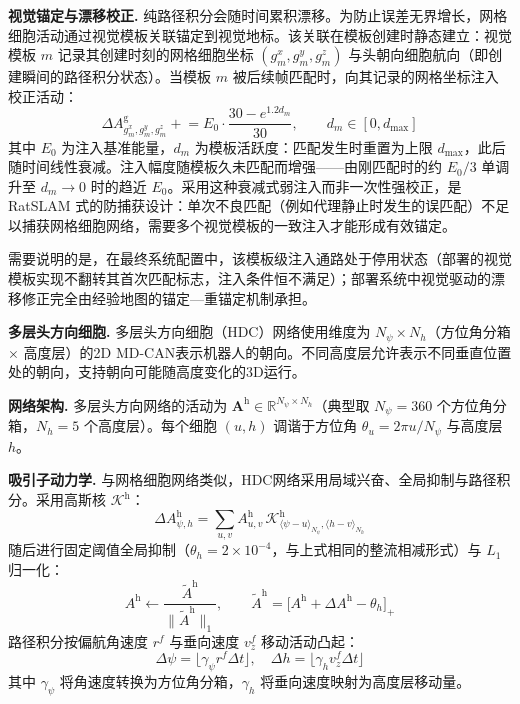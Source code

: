 \textbf{视觉锚定与漂移校正.} 纯路径积分会随时间累积漂移。为防止误差无界增长，网格细胞活动通过视觉模板关联锚定到视觉地标。该关联在模板创建时静态建立：视觉模板 $m$ 记录其创建时刻的网格细胞坐标 $(g^x_m,g^y_m,g^z_m)$ 与头朝向细胞航向（即创建瞬间的路径积分状态）。当模板 $m$ 被后续帧匹配时，向其记录的网格坐标注入校正活动：
\begin{equation}
    \Delta A^\mathrm{g}_{g^x_m,g^y_m,g^z_m} \mathrel{+}= E_0\cdot\frac{30-e^{1.2 d_m}}{30},\qquad d_m\in[0,d_{\max}]
\end{equation}
其中 $E_0$ 为注入基准能量，$d_m$ 为模板活跃度：匹配发生时重置为上限 $d_{\max}$，此后随时间线性衰减。注入幅度随模板久未匹配而增强——由刚匹配时的约 $E_0/3$ 单调升至 $d_m\to 0$ 时的趋近 $E_0$。采用这种衰减式弱注入而非一次性强校正，是 RatSLAM 式的防捕获设计：单次不良匹配（例如代理静止时发生的误匹配）不足以捕获网格细胞网络，需要多个视觉模板的一致注入才能形成有效锚定。

需要说明的是，在最终系统配置中，该模板级注入通路处于停用状态（部署的视觉模板实现不翻转其首次匹配标志，注入条件恒不满足）；部署系统中视觉驱动的漂移修正完全由经验地图的锚定—重锚定机制承担。

\textbf{多层头方向细胞.} 多层头方向细胞（HDC）网络使用维度为 $N_\psi \times N_h$（方位角分箱 $\times$ 高度层）的2D MD-CAN表示机器人的朝向。不同高度层允许表示不同垂直位置处的朝向，支持朝向可能随高度变化的3D运行。

\textbf{网络架构.} 多层头方向网络的活动为 $\mathbf{A}^\mathrm{h} \in \mathbb{R}^{N_\psi \times N_h}$（典型取 $N_\psi = 360$ 个方位角分箱，$N_h = 5$ 个高度层）。每个细胞 $(u, h)$ 调谐于方位角 $\theta_u = 2\pi u / N_\psi$ 与高度层 $h$。

\textbf{吸引子动力学.} 与网格细胞网络类似，HDC网络采用局域兴奋、全局抑制与路径积分。采用高斯核 $\mathcal{K}^\mathrm{h}$：
\begin{equation}
    \Delta A^\mathrm{h}_{\psi,h}=\sum_{u,v}A^\mathrm{h}_{u,v}\,\mathcal{K}^\mathrm{h}_{\langle \psi-u\rangle_{N_\psi},\langle h-v\rangle_{N_h}}
\end{equation}
随后进行固定阈值全局抑制（$\theta_h = 2\times10^{-4}$，与上式相同的整流相减形式）与 $L_1$ 归一化：
\begin{equation}
    A^\mathrm{h}\leftarrow \frac{\tilde{A}^\mathrm{h}}{\lVert \tilde{A}^\mathrm{h}\rVert_1},\qquad \tilde{A}^\mathrm{h}=\big[A^\mathrm{h}+\Delta A^\mathrm{h}-\theta_h\big]_+
\end{equation}
路径积分按偏航角速度 $r^f$ 与垂向速度 $v^f_z$ 移动活动凸起：
\begin{equation}
    \Delta\psi=\lfloor \gamma_\psi r^f \Delta t\rfloor,\quad \Delta h=\lfloor \gamma_h v^f_z \Delta t\rfloor
\end{equation}
其中 $\gamma_\psi$ 将角速度转换为方位角分箱，$\gamma_h$ 将垂向速度映射为高度层移动量。

